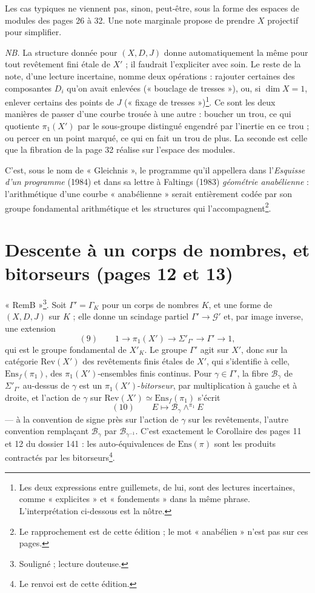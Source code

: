 \documentclass[11pt,a4paper]{article}
\begin{document}
Les cas typiques ne viennent pas, sinon, peut-être, sous la forme des espaces
de modules des pages 26 à 32. Une note marginale propose de prendre $X$
projectif pour simplifier.

\emph{NB.} La structure donnée pour $(X, D, J)$ donne automatiquement la même
pour tout revêtement fini étale de $X'$ ; il faudrait l'expliciter avec soin.
Le reste de la note, d'une lecture incertaine, nomme deux opérations : rajouter
certaines des composantes $D_i$ qu'on avait enlevées (« bouclage de
tresses »), ou, si $\dim X = 1$, enlever certains des points de $J$
(« fixage de tresses »)\footnote{Les deux expressions entre guillemets, de lui,
sont des lectures incertaines, comme « explicites » et « fondements » dans la
même phrase. L'interprétation ci-dessous est la nôtre.}. Ce sont les deux
manières de passer d'une courbe trouée à une autre : boucher un trou, ce qui
quotiente $\pi_1(X')$ par le sous-groupe distingué engendré par l'inertie en
ce trou ; ou percer en un point marqué, ce qui en fait un trou de plus. La
seconde est celle que la fibration de la page 32 réalise sur l'espace des
modules.

C'est, sous le nom de « Gleichnis », le programme qu'il appellera dans
l'\emph{Esquisse d'un programme} (1984) et dans sa lettre à Faltings (1983)
\emph{géométrie anabélienne} : l'arithmétique d'une courbe « anabélienne »
serait entièrement codée par son groupe fondamental arithmétique et les
structures qui l'accompagnent\footnote{Le rapprochement est de cette édition ;
le mot « anabélien » n'est pas sur ces pages.}.

\section*{Descente à un corps de nombres, et bitorseurs (pages 12 et 13)}

« RemB »\footnote{Souligné ; lecture douteuse.}. Soit $\Gamma' = \Gamma_K$
pour un corps de nombres $K$, et une forme de $(X, D, J)$ sur $K$ ; elle donne
un scindage partiel $\Gamma' \to \mathcal{G}'$ et, par image inverse, une
extension
\[
(9)\qquad 1 \longrightarrow \pi_1(X') \longrightarrow \Sigma'_{\Gamma'}
\longrightarrow \Gamma' \longrightarrow 1,
\]
qui est le groupe fondamental de $X'_K$. Le groupe $\Gamma'$ agit sur $X'$,
donc sur la catégorie $\mathrm{Rev}(X')$ des revêtements finis étales de $X'$,
qui s'identifie à celle, $\mathrm{Ens}_f(\pi_1)$, des $\pi_1(X')$-ensembles finis
continus. Pour $\gamma \in \Gamma'$, la fibre $\mathcal{B}_\gamma$ de
$\Sigma'_{\Gamma'}$ au-dessus de $\gamma$ est un $\pi_1(X')$-\emph{bitorseur}, par
multiplication à gauche et à droite, et l'action de $\gamma$ sur
$\mathrm{Rev}(X') \simeq \mathrm{Ens}_f(\pi_1)$ s'écrit
\[
(10)\qquad E \longmapsto \mathcal{B}_\gamma \wedge^{\pi_1} E
\]
— à la convention de signe près sur l'action de $\gamma$ sur les revêtements,
l'autre convention remplaçant $\mathcal{B}_\gamma$ par
$\mathcal{B}_{\gamma^{-1}}$. C'est exactement le Corollaire des pages 11 et 12
du dossier 141 : les auto-équivalences de $\mathrm{Ens}(\pi)$ sont les produits
contractés par les bitorseurs\footnote{Le renvoi est de cette édition.}.
\end{document}

